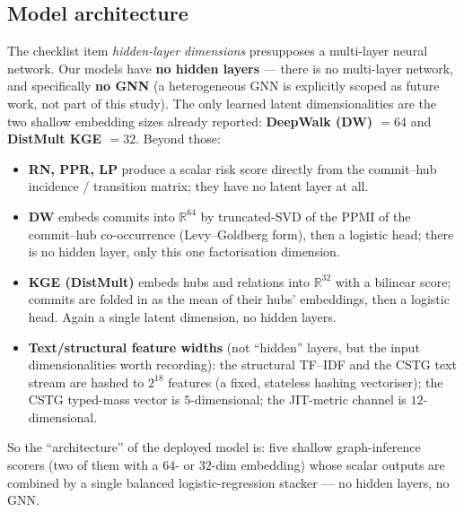 	\subsection{Model architecture}
	\label{sec:setup-arch}
	The checklist item \emph{hidden-layer dimensions} presupposes a multi-layer neural
	network. Our models have \textbf{no hidden layers} --- there is no multi-layer
	network, and specifically \textbf{no GNN} (a heterogeneous GNN is explicitly scoped as
	future work, not part of this study). The only learned latent dimensionalities are the
	two shallow embedding sizes already reported: \textbf{DeepWalk (DW) $=64$} and
	\textbf{DistMult KGE $=32$}. Beyond those:
	\begin{itemize}[nosep,leftmargin=1.4em]
		\item \textbf{RN, PPR, LP} produce a scalar risk score directly from the
		commit--hub incidence / transition matrix; they have no latent layer at all.
		\item \textbf{DW} embeds commits into $\mathbb{R}^{64}$ by truncated-SVD of the PPMI
		of the commit--hub co-occurrence (Levy--Goldberg form), then a logistic head; there
		is no hidden layer, only this one factorisation dimension.
		\item \textbf{KGE (DistMult)} embeds hubs and relations into $\mathbb{R}^{32}$ with a
		bilinear score; commits are folded in as the mean of their hubs' embeddings, then a
		logistic head. Again a single latent dimension, no hidden layers.
		\item \textbf{Text/structural feature widths} (not ``hidden'' layers, but the input
		dimensionalities worth recording): the structural TF--IDF and the CSTG text stream
		are hashed to $2^{18}$ features (a fixed, stateless hashing vectoriser); the CSTG
		typed-mass vector is $5$-dimensional; the JIT-metric channel is $12$-dimensional.
	\end{itemize}
	So the ``architecture'' of the deployed model is: five shallow graph-inference scorers
	(two of them with a $64$- or $32$-dim embedding) whose scalar outputs are combined by a
	single balanced logistic-regression stacker --- no hidden layers, no GNN.

